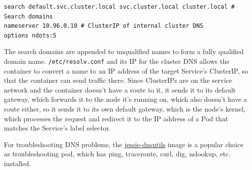 \documentclass[table, xcdraw]{article}%
\begin{document}
\begin{verbatim}
search default.svc.cluster.local svc.cluster.local cluster.local # Search domains
nameserver 10.96.0.10 # ClusterIP of internal cluster DNS
options ndots:5
\end{verbatim}

The search domains are appended to unqualified names to form a fully qualified domain name. \texttt{/etc/resolv.conf} and its IP for the cluster DNS allows the container to convert a name to an IP address of the target Service’s ClusterIP, so that the container can send traffic there. Since ClusterIPs are on the service network and the container doesn’t have a route to it, it sends it to its default gateway, which forwards it to the node it’s running on, which also doesn’t have a route either, so it sends it to its own default gateway, which is the node’s kernel, which processes the request and redirect it to the IP address of a Pod that matches the Service’s label selector.

For troubleshooting DNS problems, the \href{registry.k8s.io/e2e-test-images/jessie-dnsutils}{jessie-dnsutils} image is a popular choice as troubleshooting pod, which has ping, traceroute, curl, dig, nslookup, etc. installed.
\end{document}
